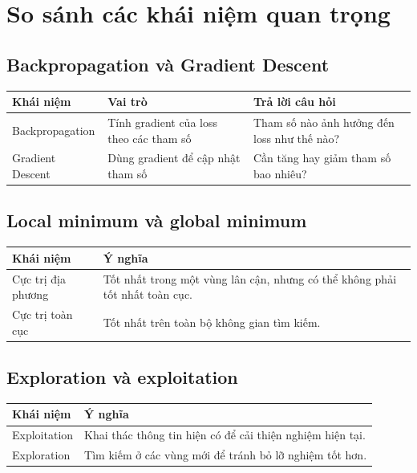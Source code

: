 \documentclass[12pt,a4paper]{report}
\begin{document}
\chapter{So sánh các khái niệm quan trọng}

\section{Backpropagation và Gradient Descent}

\begin{center}
\begin{tabular}{p{}p{}p{}}
\toprule
Khái niệm & Vai trò & Trả lời câu hỏi \\
\midrule
Backpropagation & Tính gradient của loss theo các tham số & Tham số nào ảnh hưởng đến loss như thế nào? \\
Gradient Descent & Dùng gradient để cập nhật tham số & Cần tăng hay giảm tham số bao nhiêu? \\
\bottomrule
\end{tabular}
\end{center}

\section{Local minimum và global minimum}

\begin{center}
\begin{tabular}{p{}p{}}
\toprule
Khái niệm & Ý nghĩa \\
\midrule
Cực trị địa phương & Tốt nhất trong một vùng lân cận, nhưng có thể không phải tốt nhất toàn cục. \\
Cực trị toàn cục & Tốt nhất trên toàn bộ không gian tìm kiếm. \\
\bottomrule
\end{tabular}
\end{center}

\section{Exploration và exploitation}

\begin{center}
\begin{tabular}{p{}p{}}
\toprule
Khái niệm & Ý nghĩa \\
\midrule
Exploitation & Khai thác thông tin hiện có để cải thiện nghiệm hiện tại. \\
Exploration & Tìm kiếm ở các vùng mới để tránh bỏ lỡ nghiệm tốt hơn. \\
\bottomrule
\end{tabular}
\end{center}
\end{document}
